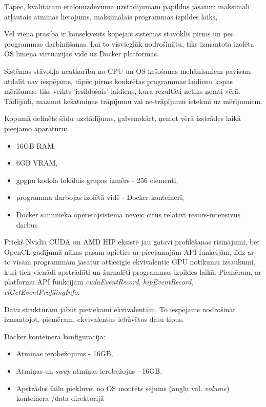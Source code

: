 \documentclass[12pt]{report}%
\theoremstyle{definition}
\begin{document}
Tāpēc, kvalitātam etalonuzdevuma uzstadījumam papildus jāsatur:
maksimāli atļautais atmiņas lietojums,
maksimālais programmas izpildes laiks,

Vēl viena prasība ir konsekvents kopējais sistēmas stāvoklis pirms un pēc programmas darbināšanas. Lai to visvieglāk nodrošinātu,
tiks izmantota izolēta OS līmeņa virtuāzijas vide uz Docker\cite{docker-docs-engine} platformas.

Sistēmas stāvokļa neatkarību no CPU un OS kešošanas mehānismiem pavisam atdalīt nav iespējams, tāpēc pirms konkrētas programmas laidienu kopas mērīšanas,
tiks veikts 'iesildošais' laidiens, kura rezultāti netiks ņemti vērā. Tādējādi, mazinot kešatmiņas trāpījumu vai ne-trāpījumu ietekmi uz mērījumiem.

Kopumā definēts šādu uzstādījums, galvenokārt, ņemot vērā izstrādes laikā pieejamo aparatūru:
\begin{itemize}
    \item 16GB RAM,
    \item 6GB VRAM,
    \item gpgpu kodola lokālais grupas izmērs - 256 elementi,
    \item programma darbojas izolētā vidē - Docker konteinerī,
    \item Docker saimnieka operētājsistēma neveic citus relatīvi resurs-intensīvus darbus
\end{itemize}

Priekš Nvidia CUDA un AMD HIP eksistē jau gatavi profilēšanas risinājumi, bet
OpenCL gadījumā nākas pašam apieties ar pieejamajām API funkcijām, līdz ar to
visām programmām jāsatur attiecīgie ekvivalentie GPU notikumu izsaukumi, kuri
tiek vienādi apstrādāti un žurnalēti programmas izpildes laikā. Piemēram, ar
platformu API funkcijām \textit{cudaEventRecord}, \textit{hipEventRecord},
\textit{clGetEventProfilingInfo}.


Datu struktūrām jābūt pietiekami ekvivalentām. To iespējams nodrošināt izmantojot, piemēram, ekvivalentus iebūvētos datu tipus.


Docker konteinera konfigurācija:
\begin{itemize}
    \item Atmiņas ierobežojums - 16GB,
    \item Atmiņas un \textit{swap} atmiņas ierobežojus - 16GB,
    \item Apstrādes failu piekļuvei no OS montēts sējums (angļu val. \textit{volume}) konteinera /data direktorijā
\end{itemize}
\end{document}

